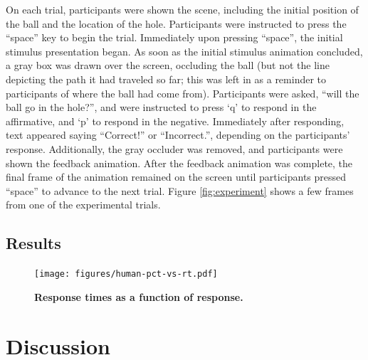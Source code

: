 \documentclass[11pt]{article}
\begin{document}
On each trial, participants were shown the scene, including the initial position of the ball and the location of the hole. Participants were instructed to press the ``space'' key to begin the trial. Immediately upon pressing ``space'', the initial stimulus presentation began. As soon as the initial stimulus animation concluded, a gray box was drawn over the screen, occluding the ball (but not the line depicting the path it had traveled so far; this was left in as a reminder to participants of where the ball had come from). Participants were asked, ``will the ball go in the hole?'', and were instructed to press `q' to respond in the affirmative, and `p' to respond in the negative. Immediately after responding, text appeared saying ``Correct!'' or ``Incorrect.'', depending on the participants' response. Additionally, the gray occluder was removed, and participants were shown the feedback animation. After the feedback animation was complete, the final frame of the animation remained on the screen until participants pressed ``space'' to advance to the next trial. Figure \ref{fig:experiment} shows a few frames from one of the experimental trials.

\subsection{Results}

\begin{figure}[h]
    \begin{center}
        \texttt{[image: figures/human-pct-vs-rt.pdf]}
        \caption{\textbf{Response times as a function of response.}}
        \label{fig:pct-vs-rt}
    \end{center}
\end{figure}



\section{Discussion}


\end{document}
